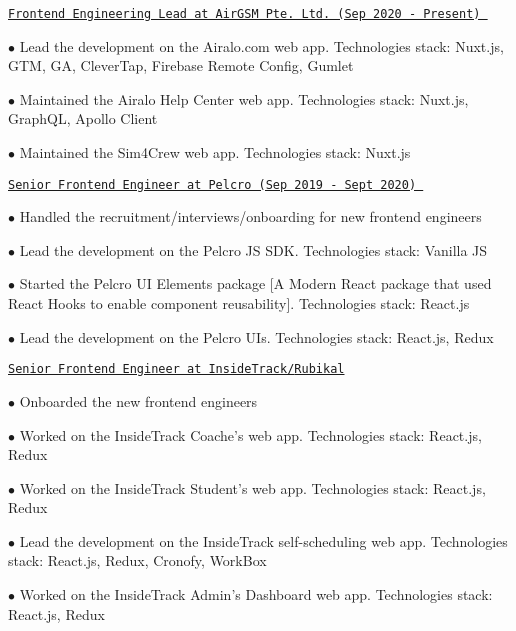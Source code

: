 \documentclass[letterpaper]{article}
\renewenvironment{itemize}{
  \begin{list}{}{
    \setlength{\leftmargin}{1.5em}
  }
}{
  \end{list}
}
\begin{document}
\begin{itemize}
  \item \href{https://www.airalo.com/}{\tt Frontend Engineering Lead at AirGSM Pte. Ltd.​ (Sep 2020 - Present) }
    \begin{itemize}
      \item $\bullet$ Lead the development on the Airalo.com web app. Technologies stack: Nuxt.js, GTM, GA, CleverTap, Firebase Remote Config, Gumlet
      \item $\bullet$ Maintained the Airalo Help Center web app. Technologies stack: Nuxt.js, GraphQL, Apollo Client
      \item $\bullet$ Maintained the Sim4Crew web app. Technologies stack: Nuxt.js
    \end{itemize}
  \item \href{https://www.pelcro.com/}{\tt Senior Frontend Engineer at Pelcro (Sep 2019 - Sept 2020) }
    \begin{itemize}
      \item $\bullet$ Handled the recruitment/interviews/onboarding for new frontend engineers
      \item $\bullet$ Lead the development on the Pelcro JS SDK. Technologies stack: Vanilla JS
      \item $\bullet$ Started the Pelcro UI Elements package [A Modern React package that used React Hooks to enable component reusability]. Technologies stack: React.js
      \item $\bullet$ Lead the development on the Pelcro UIs. Technologies stack: React.js, Redux
    \end{itemize}
  \item \href{https://www.insidetrack.com/}{\tt Senior Frontend Engineer at InsideTrack/}\href{http://www.rubikal.com/}{\tt Rubikal}
    \begin{itemize}
      \item $\bullet$ Onboarded the new frontend engineers
      \item $\bullet$ Worked on the InsideTrack Coache's web app. Technologies stack: React.js, Redux
      \item $\bullet$ Worked on the InsideTrack Student's web app. Technologies stack: React.js, Redux
      \item $\bullet$ Lead the development on the InsideTrack self-scheduling web app. Technologies stack: React.js, Redux, Cronofy, WorkBox
      \item $\bullet$ Worked on the InsideTrack Admin's Dashboard web app. Technologies stack: React.js, Redux

\end{itemize}
\end{itemize}
\end{document}
